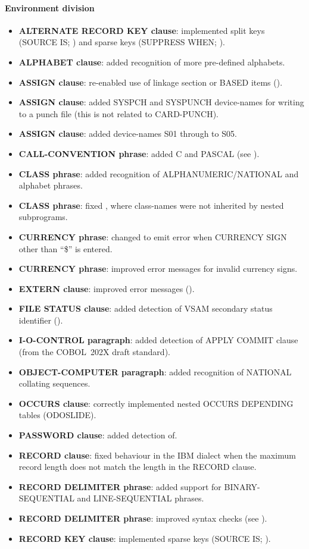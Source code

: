 \paragraph{Environment division}
\begin{itemize}
\item \textbf{ALTERNATE RECORD KEY clause}: implemented split keys (SOURCE IS; ) and sparse keys (SUPPRESS WHEN; ).
\item \textbf{ALPHABET clause}: added recognition of more pre-defined alphabets.
\item \textbf{ASSIGN clause}: re-enabled use of linkage section or BASED items ().
\item \textbf{ASSIGN clause}: added SYSPCH and SYSPUNCH device-names for writing to a punch file (this is not related to CARD-PUNCH).
\item \textbf{ASSIGN clause}: added device-names S01 through to S05.
\item \textbf{CALL-CONVENTION phrase}: added C and PASCAL (see ).
\item \textbf{CLASS phrase}: added recognition of ALPHANUMERIC\slash{}NATIONAL and alphabet phrases.
\item \textbf{CLASS phrase}: fixed , where class-names were not inherited by nested subprograms.
\item \textbf{CURRENCY phrase}: changed to emit error when CURRENCY SIGN other than ``\$'' is entered.
\item \textbf{CURRENCY phrase}: improved error messages for invalid currency signs.
\item \textbf{EXTERN clause}: improved error messages ().
\item \textbf{FILE STATUS clause}: added detection of VSAM secondary status identifier ().
\item \textbf{I-O-CONTROL paragraph}: added detection of APPLY COMMIT clause (from the COBOL~202X draft standard).
\item \textbf{OBJECT-COMPUTER paragraph}: added recognition of NATIONAL collating sequences.
\item \textbf{OCCURS clause}: correctly implemented nested OCCURS DEPENDING tables (ODOSLIDE).
\item \textbf{PASSWORD clause}: added detection of.
\item \textbf{RECORD clause}: fixed behaviour in the IBM dialect when the maximum record length does not match the length in the RECORD clause.
\item \textbf{RECORD DELIMITER phrase}:  added support for BINARY-SEQUENTIAL and LINE-SEQUENTIAL phrases.
\item \textbf{RECORD DELIMITER phrase}: improved syntax checks (see ).
\item \textbf{RECORD KEY clause}: implemented sparse keys (SOURCE IS; ).
\end{itemize}

